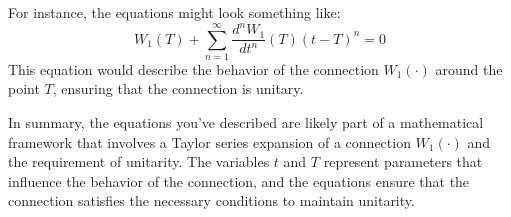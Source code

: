 For instance, the equations might look something like:
\[
W_1(T) + \sum_{n=1}^{\infty} \frac{d^n W_1}{dt^n}(T) (t-T)^n = 0
\]
This equation would describe the behavior of the connection \( W_1(\cdot) \) around the point \( T \), ensuring that the connection is unitary.

In summary, the equations you've described are likely part of a mathematical framework that involves a Taylor series expansion of a connection \( W_1(\cdot) \) and the requirement of unitarity. The variables \( t \) and \( T \) represent parameters that influence the behavior of the connection, and the equations ensure that the connection satisfies the necessary conditions to maintain unitarity.